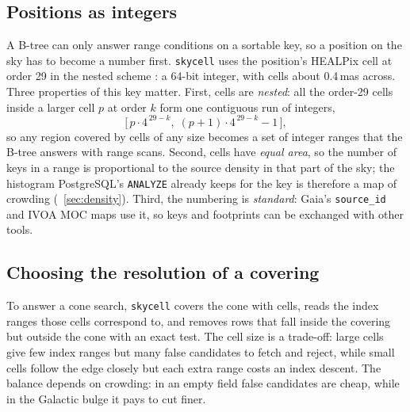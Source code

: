 \subsection{Positions as integers}
\label{sec:key}

A B-tree can only answer range conditions on a sortable key, so a position on the sky
has to become a number first. \texttt{skycell} uses the position's HEALPix cell at order
29 in the nested scheme \citep{healpix}: a 64-bit integer, with cells about 0.4\,mas
across. Three properties of this key matter. First, cells are \emph{nested}: all the
order-29 cells inside a larger cell $p$ at order $k$ form one contiguous run of
integers,
\begin{equation}
  \bigl[\, p\cdot 4^{\,29-k},\; (p+1)\cdot 4^{\,29-k} - 1 \,\bigr],
  \label{eq:interval}
\end{equation}
so any region covered by cells of any size becomes a set of integer ranges that the
B-tree answers with range scans. Second, cells have \emph{equal area}, so the number of
keys in a range is proportional to the source density in that part of the sky; the
histogram PostgreSQL's \texttt{ANALYZE} already keeps for the key is therefore a map of
crowding (\Sect~\ref{sec:density}). Third, the numbering is \emph{standard}: Gaia's
\texttt{source\_id} \citep{gaia} and IVOA MOC maps \citep{moc} use it, so keys and
footprints can be exchanged with other tools.

\subsection{Choosing the resolution of a covering}
\label{sec:cost}

To answer a cone search, \texttt{skycell} covers the cone with cells, reads the index
ranges those cells correspond to, and removes rows that fall inside the covering but
outside the cone with an exact test. The cell size is a trade-off: large cells give few index
ranges but many false candidates to fetch and reject, while small cells follow the edge
closely but each extra range costs an index descent. The balance depends on crowding:
in an empty field false candidates are cheap, while in the Galactic bulge it pays to cut
finer.

